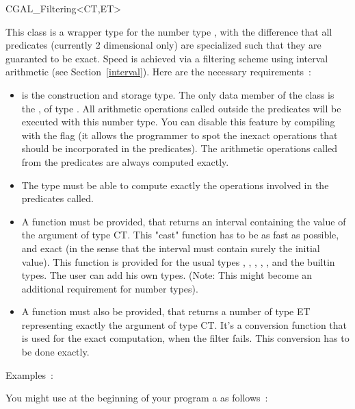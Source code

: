 \begin{ccClass} {CGAL_Filtering<CT,ET>}
\label{filter}

This class is a wrapper type for the number type , with the difference
that all predicates (currently 2 dimensional only) are specialized
such that they are guaranted to be exact.  Speed is achieved via a filtering
scheme using interval arithmetic (see Section~\ref{interval}).  Here are the
necessary requirements~:

\begin{itemize}
\item {} is the construction and storage type.  The only data member of
      the class  is the , of type
      .
      All arithmetic operations called
      outside the predicates will be executed with this number type.  You can
      disable this feature by compiling with the flag
       (it allows the programmer
      to spot the inexact operations that should be incorporated in the
      predicates).
      The arithmetic operations called from the predicates are always computed
      exactly.
\item The  type must be able to compute exactly the operations involved
      in the predicates called.
\item A  function must be provided, that
      returns an interval containing the value of the argument of type CT.
      This "cast" function has to be as fast as possible, and exact (in the
      sense that the interval must contain surely the initial value).  This
      function is provided for the usual types , ,
      , , , and the
      builtin types.  The user can add his own types.  (Note: This might become
      an additional requirement for number types).
\item A  function must also be provided, that
      returns a number of type ET representing exactly the argument of type
      CT.  It's a conversion function that is used for the exact computation,
      when the filter fails.
      This conversion has to be done exactly.
\end{itemize}

Examples~:

You might use at the beginning of your program a  as follows~:


\end{ccClass}
